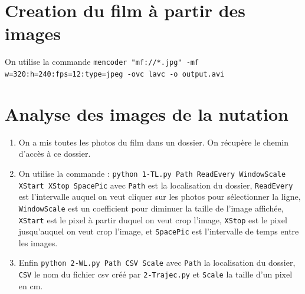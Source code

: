\documentclass[10pt,a4paper]{article}
\begin{document}
\section{Creation du film à partir des images\label{film}}
On utilise la commande \texttt{mencoder "mf://*.jpg" -mf w=320:h=240:fps=12:type=jpeg -ovc lavc -o output.avi}


\section{Analyse des images de la nutation\label{anaNut}}
\begin{enumerate}
    \item On a mis toutes les photos du film dans un dossier. On récupère le chemin d'accès à ce dossier.
    \item On utilise la commande : \texttt{python 1-TL.py Path ReadEvery WindowScale XStart XStop SpacePic} avec \texttt{Path} est la localisation du dossier, \texttt{ReadEvery} est l'intervalle auquel on veut cliquer sur les photos pour sélectionner la ligne, \texttt{WindowScale} est un coefficient pour diminuer la taille de l'image affichée, \texttt{XStart} est le pixel à partir duquel on veut crop l'image, \texttt{XStop} est le pixel jusqu'auquel on veut crop l'image, et \texttt{SpacePic} est l'intervalle de temps entre les images.
    \item Enfin \texttt{python 2-WL.py Path CSV Scale} avec \texttt{Path} la localisation du dossier, \texttt{CSV} le nom du fichier csv créé par \texttt{2-Trajec.py} et \texttt{Scale} la taille d'un pixel en cm.
\end{enumerate}
\end{document}

